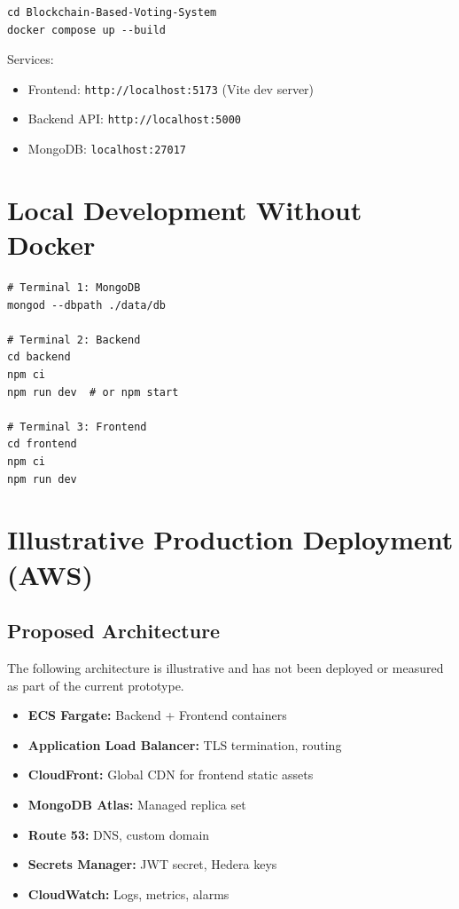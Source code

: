 \begin{lstlisting}[style=terminalStyle, caption=Start development stack]
cd Blockchain-Based-Voting-System
docker compose up --build
\end{lstlisting}

Services:
\begin{itemize}
    \item Frontend: \texttt{http://localhost:5173} (Vite dev server)
    \item Backend API: \texttt{http://localhost:5000}
    \item MongoDB: \texttt{localhost:27017}
\end{itemize}

\section{Local Development Without Docker}
\label{sec:local-dev}

\begin{lstlisting}[style=terminalStyle, caption=Manual startup]
# Terminal 1: MongoDB
mongod --dbpath ./data/db

# Terminal 2: Backend
cd backend
npm ci
npm run dev  # or npm start

# Terminal 3: Frontend
cd frontend
npm ci
npm run dev
\end{lstlisting}

\section{Illustrative Production Deployment (AWS)}
\label{sec:prod-aws}

\subsection{Proposed Architecture}
The following architecture is illustrative and has not been deployed or measured
as part of the current prototype.
\begin{itemize}
    \item \textbf{ECS Fargate:} Backend + Frontend containers
    \item \textbf{Application Load Balancer:} TLS termination, routing
    \item \textbf{CloudFront:} Global CDN for frontend static assets
    \item \textbf{MongoDB Atlas:} Managed replica set
    \item \textbf{Route 53:} DNS, custom domain
    \item \textbf{Secrets Manager:} JWT secret, Hedera keys
    \item \textbf{CloudWatch:} Logs, metrics, alarms
\end{itemize}

